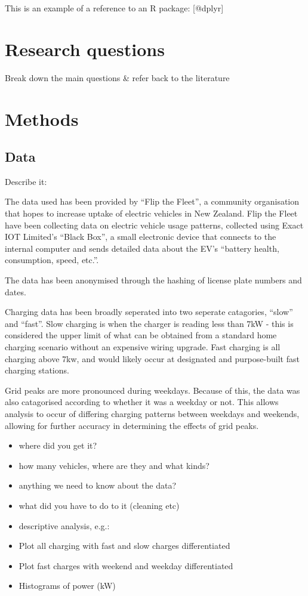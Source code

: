 \documentclass[]{article}
\providecommand{\tightlist}{%
  \setlength{\itemsep}{0pt}\setlength{\parskip}{0pt}}
\begin{document}
This is an example of a reference to an R package: {[}@dplyr{]}

\section{Research questions}\label{research-questions}

Break down the main questions \& refer back to the literature

\section{Methods}\label{methods}

\subsection{Data}\label{data}

Describe it:

The data used has been provided by ``Flip the Fleet'', a community
organisation that hopes to increase uptake of electric vehicles in New
Zealand. Flip the Fleet have been collecting data on electric vehicle
usage patterns, collected using Exact IOT Limited's ``Black Box'', a
small electronic device that connects to the internal computer and sends
detailed data about the EV's ``battery health, consumption, speed,
etc.''.

The data has been anonymised through the hashing of license plate
numbers and dates.

Charging data has been broadly seperated into two seperate catagories,
``slow'' and ``fast''. Slow charging is when the charger is reading less
than 7kW - this is considered the upper limit of what can be obtained
from a standard home charging scenario without an expensive wiring
upgrade. Fast charging is all charging above 7kw, and would likely occur
at designated and purpose-built fast charging stations.

Grid peaks are more pronounced during weekdays. Because of this, the
data was also catagorised according to whether it was a weekday or not.
This allows analysis to occur of differing charging patterns between
weekdays and weekends, allowing for further accuracy in determining the
effects of grid peaks.

\begin{itemize}
\tightlist
\item
  where did you get it?
\item
  how many vehicles, where are they and what kinds?
\item
  anything we need to know about the data?
\item
  what did you have to do to it (cleaning etc)
\item
  descriptive analysis, e.g.:
\item
  Plot all charging with fast and slow charges differentiated
\item
  Plot fast charges with weekend and weekday differentiated
\item
  Histograms of power (kW)
\end{itemize}
\end{document}

